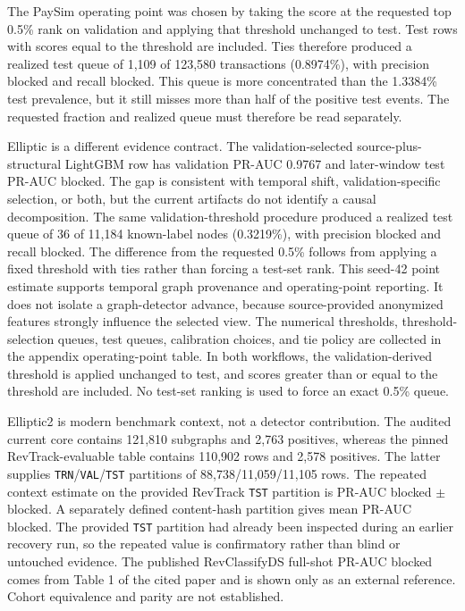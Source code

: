 \documentclass[11pt]{article}
\begin{document}
The PaySim operating point was chosen by taking the score at the requested top 0.5\% rank on validation and applying that threshold unchanged to test. Test rows with scores equal to the threshold are included. Ties therefore produced a realized test queue of 1,109 of 123,580 transactions (0.8974\%), with precision blocked and recall blocked. This queue is more concentrated than the 1.3384\% test prevalence, but it still misses more than half of the positive test events. The requested fraction and realized queue must therefore be read separately.

Elliptic is a different evidence contract. The validation-selected source-plus-structural LightGBM row has validation PR-AUC 0.9767 and later-window test PR-AUC blocked. The gap is consistent with temporal shift, validation-specific selection, or both, but the current artifacts do not identify a causal decomposition. The same validation-threshold procedure produced a realized test queue of 36 of 11,184 known-label nodes (0.3219\%), with precision blocked and recall blocked. The difference from the requested 0.5\% follows from applying a fixed threshold with ties rather than forcing a test-set rank. This seed-42 point estimate supports temporal graph provenance and operating-point reporting. It does not isolate a graph-detector advance, because source-provided anonymized features strongly influence the selected view.
The numerical thresholds, threshold-selection queues, test queues, calibration choices, and tie policy are collected in the appendix operating-point table. In both workflows, the validation-derived threshold is applied unchanged to test, and scores greater than or equal to the threshold are included. No test-set ranking is used to force an exact 0.5\% queue.

Elliptic2 is modern benchmark context, not a detector contribution. The audited current core contains 121,810 subgraphs and 2,763 positives, whereas the pinned RevTrack-evaluable table contains 110,902 rows and 2,578 positives. The latter supplies \nolinkurl{TRN}/\nolinkurl{VAL}/\nolinkurl{TST} partitions of 88,738/11,059/11,105 rows. The repeated context estimate on the provided RevTrack \nolinkurl{TST} partition is PR-AUC blocked \ensuremath{\pm} blocked. A separately defined content-hash partition gives mean PR-AUC blocked. The provided \nolinkurl{TST} partition had already been inspected during an earlier recovery run, so the repeated value is confirmatory rather than blind or untouched evidence. The published RevClassifyDS full-shot PR-AUC blocked comes from Table 1 of the cited paper and is shown only as an external reference. Cohort equivalence and parity are not established.
\end{document}
